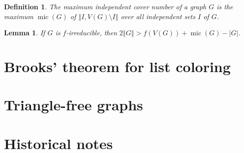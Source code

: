 \documentclass[openany]{tufte-book} %
\theoremstyle{plain}
\newtheorem{definition}{Definition}
\newtheorem{lemma}{Lemma}
\newcommand{\size}[1]{\left\Vert#1\right\Vert}
\newcommand{\mic}{\operatorname{mic}}
\begin{document}
\begin{definition} The \emph{maximum independent cover number }of a graph $G$
is the maximum $\mic(G)$ of $\size{I,V(G)\setminus I}$ over all independent sets $I$
of $G$. 
\end{definition}

\begin{lemma}
If $G$ is $f$-irreducible, then $2\size{G} > f(V(G)) + \mic(G) - |G|$.
\end{lemma}
\section{Brooks' theorem for list coloring}
\section{Triangle-free graphs}
\section{Historical notes}
\end{document}
